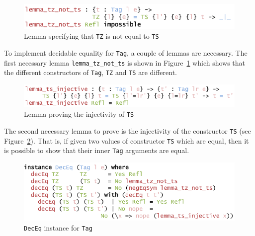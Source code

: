 \documentclass{ituthesis}
\newcommand{\ttconstructor}[1]{\textcolor{constructor-color}{\texttt{#1}}}
\newcommand{\tttype}[1]{\textcolor{type-color}{\texttt{#1}}}
\newcommand{\ttdec}[1]{\textcolor{declared-var-color}{\texttt{#1}}}
\theoremstyle{break}
\begin{document}
\begin{figure}[ht]
\begin{center}
    \includegraphics[scale=0.5]{Figures/TagDecEqLemma1.png}
\end{center}
\caption{Lemma specifying that \ttconstructor{TZ} is not equal to \ttconstructor{TS}}
\label{fig:taglem1}
\end{figure}

To implement decidable equality for \tttype{Tag}, a couple of lemmas are necessary.
The first necessary lemma \ttdec{lemma\_tz\_not\_ts} is shown in Figure~\ref{fig:taglem1} which shows that the different constructors of \tttype{Tag},
\ttconstructor{TZ} and \ttconstructor{TS} are different.

\begin{figure}[ht]
\begin{center}
    \includegraphics[scale=0.5]{Figures/TagDecEqLemma2.png}
\end{center}
\caption{Lemma proving the injectivity of \ttconstructor{TS}}
\label{fig:taglem2}
\end{figure}

The second necessary lemma to prove is the injectivity of the constructor \ttconstructor{TS} (see Figure~\ref{fig:taglem2}).
That is, if given two values of constructor \ttconstructor{TS} which are equal, then it is possible to show that their inner \tttype{Tag} arguments
are equal.

\begin{figure}[ht]
\begin{center}
    \includegraphics[scale=0.5]{Figures/TagDecEqLemmaInstance.png}
\end{center}
\caption{\tttype{DecEq} instance for \tttype{Tag}}
\label{fig:tagdeceqinst}
\end{figure}
\end{document}

